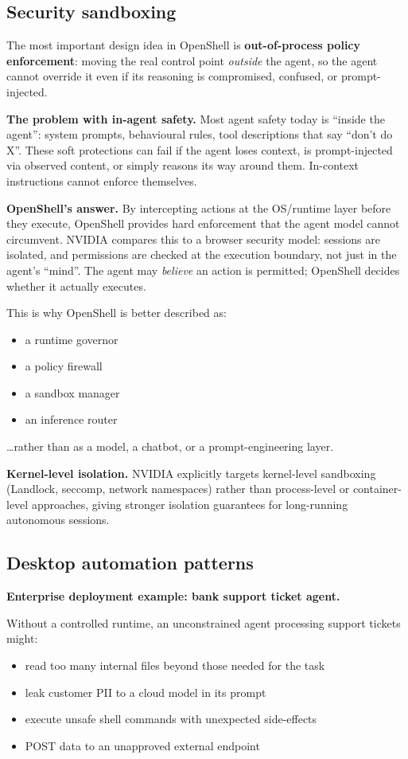 \subsection{Security sandboxing}

The most important design idea in OpenShell is \textbf{out-of-process policy
enforcement}: moving the real control point \emph{outside} the agent, so the agent
cannot override it even if its reasoning is compromised, confused, or
prompt-injected.

\textbf{The problem with in-agent safety.} Most agent safety today is ``inside the
agent'': system prompts, behavioural rules, tool descriptions that say ``don't do X''.
These soft protections can fail if the agent loses context, is prompt-injected via
observed content, or simply reasons its way around them. In-context instructions
cannot enforce themselves.

\textbf{OpenShell's answer.} By intercepting actions at the OS/runtime layer before
they execute, OpenShell provides hard enforcement that the agent model cannot
circumvent. NVIDIA compares this to a browser security model: sessions are isolated,
and permissions are checked at the execution boundary, not just in the agent's
``mind''. The agent may \emph{believe} an action is permitted; OpenShell decides
whether it actually executes.

This is why OpenShell is better described as:
\begin{itemize}
  \item a runtime governor
  \item a policy firewall
  \item a sandbox manager
  \item an inference router
\end{itemize}
\ldots rather than as a model, a chatbot, or a prompt-engineering layer.

\textbf{Kernel-level isolation.} NVIDIA explicitly targets kernel-level sandboxing
(Landlock, seccomp, network namespaces) rather than process-level or
container-level approaches, giving stronger isolation guarantees for long-running
autonomous sessions.

\subsection{Desktop automation patterns}

\textbf{Enterprise deployment example: bank support ticket agent.}

Without a controlled runtime, an unconstrained agent processing support tickets might:
\begin{itemize}
  \item read too many internal files beyond those needed for the task
  \item leak customer PII to a cloud model in its prompt
  \item execute unsafe shell commands with unexpected side-effects
  \item POST data to an unapproved external endpoint
\end{itemize}

